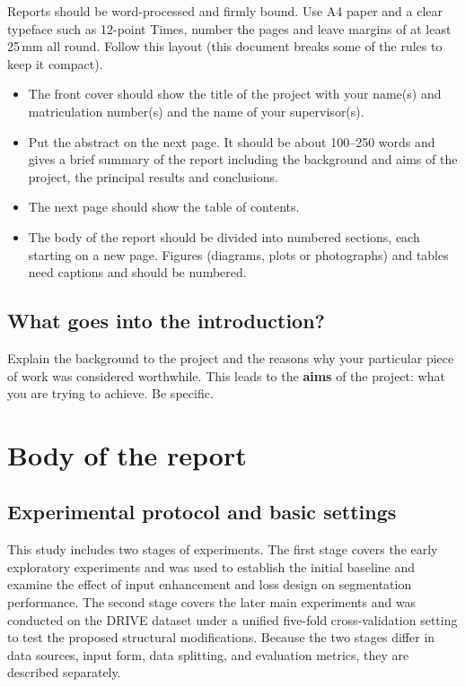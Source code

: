 \documentclass[a4paper,12pt]{article}
\begin{document}
Reports should be word-processed and firmly bound. Use A4 paper and a clear typeface such as 12-point Times, number the pages and leave margins of at least 25\,mm all round. Follow this layout (this document breaks some of the rules to keep it compact).
\begin{itemize}
\item
The front cover should show the title of the project with your name(s) and matriculation number(s) and the name of your supervisor(s).
\item
Put the abstract on the next page. It should be about 100--250 words and gives a brief summary of the report including the background and aims of the project, the principal results and conclusions.
\item
The next page should show the table of contents. 
\item
The body of the report should be divided into numbered sections, each starting on a new page. Figures (diagrams, plots or photographs) and tables need captions and should be numbered.
\end{itemize}

\subsection{What goes into the introduction?}

Explain the background to the project and the reasons why your particular piece of work was considered worthwhile. This leads to the \textbf{aims} of the project: what you are trying to achieve. Be specific.


\section{Body of the report}

\subsection{Experimental protocol and basic settings}

This study includes two stages of experiments. The first stage covers the early exploratory experiments and was used to establish the initial baseline and examine the effect of input enhancement and loss design on segmentation performance. The second stage covers the later main experiments and was conducted on the DRIVE dataset \cite{staal2004drive} under a unified five-fold cross-validation setting to test the proposed structural modifications. Because the two stages differ in data sources, input form, data splitting, and evaluation metrics, they are described separately.
\end{document}
